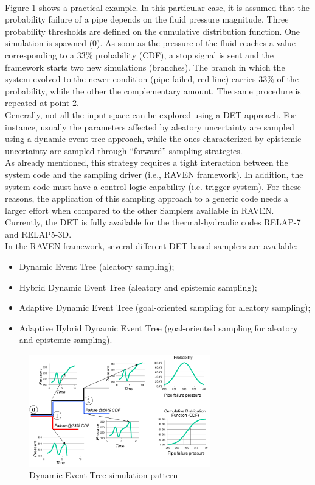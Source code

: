\\Figure \ref{fig:DETschemeExample} shows a practical example. In this particular case, it is assumed that the 
probability failure of a pipe depends on the fluid pressure magnitude. Three probability thresholds are defined on 
the cumulative distribution function. One simulation is spawned (0). As soon as the pressure of the fluid reaches a 
value corresponding to a 33\% probability (CDF), a stop signal is sent and the framework starts two new 
simulations (branches). The branch in which the system evolved to the newer condition (pipe failed, red line) 
carries 33\% of the probability, while the other the complementary amount. The same procedure is repeated at 
point 2.
\\Generally, not all the input space can be explored using a DET approach. For instance, usually the parameters affected by aleatory uncertainty are sampled using a dynamic event tree approach, while the ones characterized by epistemic uncertainty are sampled through ``forward'' sampling strategies. 
\\As already mentioned, this strategy requires a tight interaction between the system code and the sampling driver (i.e., RAVEN framework). In addition, the system code must have a control logic capability (i.e. trigger system). For these reasons, the application of this sampling approach to a generic code needs a larger effort when compared to the other Samplers available in RAVEN. Currently, the DET is fully available for the thermal-hydraulic codes RELAP-7 and RELAP5-3D.
\\In the RAVEN framework, several different DET-based samplers are available:
\begin{itemize}
\item Dynamic Event Tree (aleatory sampling);
\item Hybrid Dynamic Event Tree (aleatory and epistemic sampling);
\item Adaptive Dynamic Event Tree (goal-oriented sampling for aleatory sampling);
\item Adaptive Hybrid Dynamic Event Tree (goal-oriented sampling for aleatory and epistemic sampling).
\end{itemize}

\begin{figure}
  \centering
  \includegraphics[width=0.7\textwidth]  {pics/DETscheme.png}
  \caption{Dynamic Event Tree simulation pattern}
  \label{fig:DETschemeExample}
\end{figure}

